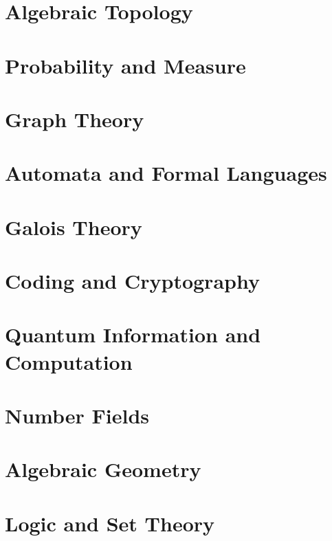 \newcommand{\yearnumber}{II}


\chapter{Algebraic Topology}

\chapter{Probability and Measure}

\chapter{Graph Theory}

\chapter{Automata and Formal Languages}

\chapter{Galois Theory}

\chapter{Coding and Cryptography}

\chapter{Quantum Information and Computation}

\chapter{Number Fields}

\chapter{Algebraic Geometry}

\chapter{Logic and Set Theory}



